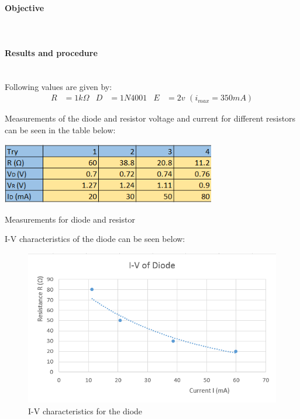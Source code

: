 \paragraph*{Objective} \hfill \\

\paragraph*{Results and procedure} \hfill\\
Following values are given by:
\begin{align*}
R&= 1k\Omega	&	D&= 1N4001	&	E&=2v\,\,(i_{max}=350mA)	
\end{align*}

Measurements of the diode and resistor voltage and current for different resistors can be seen in the table below:
\begin{table}[H]
	\centering
\includegraphics[width=0.7\textwidth]{./images/Kacper/31.png}
	\caption{Measurements for diode and resistor}
\end{table}
I-V characteristics of the diode can be seen below:
\begin{figure}[H]
	\centering
\includegraphics[width=1\textwidth]{./images/Kacper/31a.png}
	\caption{I-V characteristics for the diode}
\end{figure} 

